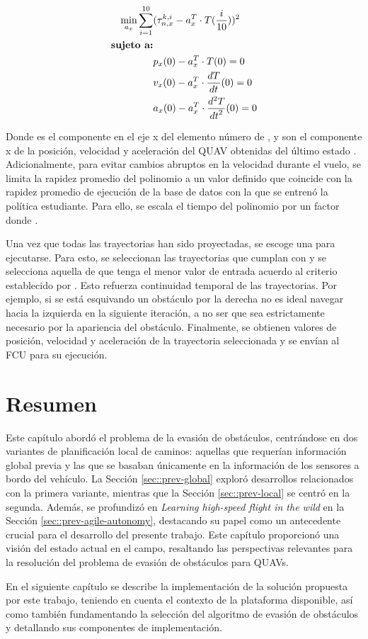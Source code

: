 \begin{equation}
\label{eq:aoa-traj-proj}
\begin{split}
    \min_{a_x} \sum_{i=1}^{10} & (\tau_{n,x}^{k,i} - a_x^T \cdot T(\frac{i}{10}))^{2} \\
    \text{\textbf{sujeto a:}} & \\
                     & p_x(0) - a_x^T \cdot T(0) = 0 \\
                     & v_x(0) - a_x^T \cdot \frac{dT}{dt}(0) = 0 \\
                     & a_x(0) - a_x^T \cdot \frac{d^2 T}{{dt}^2}(0) = 0 \\
\end{split}
\end{equation}

Donde  es el componente en el eje x del elemento número  de , y  son el componente x de la posición, velocidad y aceleración del QUAV obtenidas del último estado . Adicionalmente, para evitar cambios abruptos en la velocidad durante el vuelo, se limita la rapidez promedio del polinomio a un valor definido  que coincide con la rapidez promedio de ejecución de la base de datos con la que se entrenó la política estudiante. Para ello, se escala el tiempo  del polinomio  por un factor  donde .

Una vez que todas las trayectorias han sido proyectadas, se escoge una para ejecutarse. Para esto, se seleccionan las trayectorias que cumplan con  y se selecciona aquella de que tenga el menor valor de entrada acuerdo al criterio establecido por \cite{mellinger2011minimum}. Esto refuerza continuidad temporal de las trayectorias. Por ejemplo, si se está esquivando un obstáculo por la derecha no es ideal navegar hacia la izquierda en la siguiente iteración, a no ser que sea estrictamente necesario por la apariencia del obstáculo. Finalmente, se obtienen valores de posición, velocidad y aceleración de la trayectoria seleccionada y se envían al FCU para su ejecución.

\section{Resumen}

Este capítulo abordó el problema de la evasión de obstáculos, centrándose en dos variantes de planificación local de caminos: aquellas que requerían información global previa y las que se basaban únicamente en la información de los sensores a bordo del vehículo. La Sección \ref{sec::prev-global} exploró desarrollos relacionados con la primera variante, mientras que la Sección \ref{sec::prev-local} se centró en la segunda. Además, se profundizó en \textit{Learning high-speed flight in the wild} en la Sección \ref{sec::prev-agile-autonomy}, destacando su papel como un antecedente crucial para el desarrollo del presente trabajo. Este capítulo proporcionó una visión del estado actual en el campo, resaltando las perspectivas relevantes para la resolución del problema de evasión de obstáculos para QUAVs.

En el siguiente capítulo se describe la implementación de la solución propuesta por este trabajo, teniendo en cuenta el contexto de la plataforma disponible, así como también fundamentando la selección del algoritmo de evasión de obstáculos y detallando sus componentes de implementación.
    
   